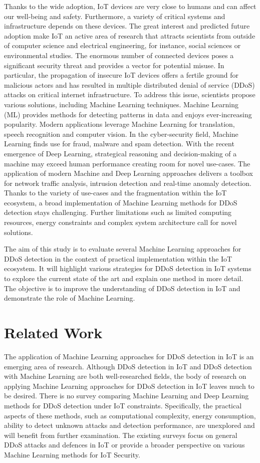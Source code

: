 \documentclass[conference, 11pt]{IEEEtran}
\begin{document}
Thanks to the wide adoption, IoT devices are very close to humans and can affect our well-being and safety.
Furthermore, a variety of critical systems and infrastructure depends on these devices.
The great interest and predicted future adoption make IoT an active area of research that attracts scientists from outside of computer science and electrical engineering, for instance, social sciences or environmental studies.
The enormous number of connected devices poses a significant security threat and provides a vector for potential misuse.
In particular, the propagation of insecure IoT devices offers a fertile ground for malicious actors and has resulted in multiple distributed denial of service (DDoS) attacks on critical internet infrastructure.
To address this issue, scientists propose various solutions, including Machine Learning techniques.
Machine Learning (ML) provides methods for detecting patterns in data and enjoys ever-increasing popularity.
Modern applications leverage Machine Learning for translation, speech recognition and computer vision.
In the cyber-security field, Machine Learning finds use for fraud, malware and spam detection.
With the recent emergence of Deep Learning, strategical reasoning and decision-making of a machine may exceed human performance creating room for novel use-cases.
The application of modern Machine and Deep Learning approaches delivers a toolbox for network traffic analysis, intrusion detection and real-time anomaly detection.
Thanks to the variety of use-cases and the fragmentation within the IoT ecosystem, a broad implementation of Machine Learning methods for DDoS detection stays challenging.
Further limitations such as limited computing resources, energy constraints and complex system architecture call for novel solutions.

The aim of this study is to evaluate several Machine Learning approaches for DDoS detection in the context of practical implementation within the IoT ecosystem.
It will highlight various strategies for DDoS detection in IoT systems to explore the current state of the art and explain one method in more detail.
The objective is to improve the understanding of DDoS detection in IoT and demonstrate the role of Machine Learning.

\section{Related Work}
The application of Machine Learning approaches for DDoS detection in IoT is an emerging area of research.
Although DDoS detection in IoT and DDoS detection with Machine Learning are both well-researched fields, the body of research on applying Machine Learning approaches for DDoS detection in IoT leaves much to be desired.
There is no survey comparing Machine Learning and Deep Learning methods for DDoS detection under IoT constraints.
Specifically, the practical aspects of these methods, such as computational complexity, energy consumption, ability to detect unknown attacks and detection performance, are unexplored and will benefit from further examination.
The existing surveys focus on general DDoS attacks and defences in IoT or provide a broader perspective on various Machine Learning methods for IoT Security.
\end{document}
